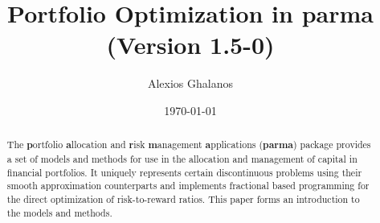 \documentclass[11pt,a4paper]{article}
\begin{document}
\title{Portfolio Optimization in \textbf{parma}\\
(Version 1.5-0)}
\author{Alexios Ghalanos}
\date{\today}
\maketitle
\begin{abstract}
The \textbf{p}ortfolio \textbf{a}llocation and \textbf{r}isk \textbf{m}anagement
\textbf{a}pplications (\textbf{parma}) package provides a set of models and
methods for use in the allocation and management of capital in financial portfolios.
It uniquely represents certain discontinuous problems using their smooth approximation
counterparts and implements fractional based programming for the direct optimization
of risk-to-reward ratios. This paper forms an introduction to the models and methods.
\end{abstract}
\clearpage
\newpage

\clearpage

\end{document}
